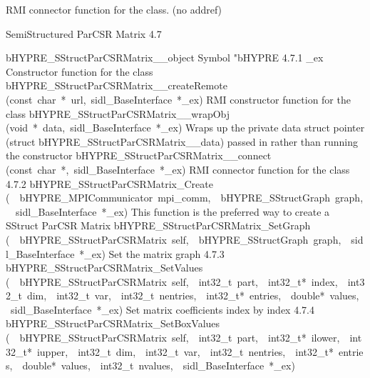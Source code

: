 \documentclass{article}
\begin{document}
\begin{cxxentry}
\begin{cxxentry}
\begin{cxxvariable}
\begin{cxxdoc}
RMI connector function for the class. (no addref)
\end{cxxdoc}
\end{cxxvariable}
\end{cxxentry}
\begin{cxxentry}
{}
        {SemiStructured ParCSR Matrix}
        {}
        {
}
        {4.7}
\begin{cxxnames}
        {bHYPRE\_SStructParCSRMatrix\_\_object}
        {}
        {
Symbol "bHYPRE}
        {4.7.1}
        {\_ex}
        {}
        {
Constructor function for the class}
        {}
\label{cxx.4.7.15}
        {bHYPRE\_SStructParCSRMatrix\_\_createRemote}
        {(const\ char\ *\ url,\ sidl\_BaseInterface\ *\_ex)}
        {
RMI constructor function for the class}
        {}
\label{cxx.4.7.16}
        {bHYPRE\_SStructParCSRMatrix\_\_wrapObj}
        {(void\ *\ data,\ sidl\_BaseInterface\ *\_ex)}
        {
Wraps up the private data struct pointer (struct bHYPRE\_SStructParCSRMatrix\_\_data) passed in rather than running the constructor}
        {}
\label{cxx.4.7.17}
        {bHYPRE\_SStructParCSRMatrix\_\_connect}
        {(const\ char\ *,\ sidl\_BaseInterface\ *\_ex)}
        {
RMI connector function for the class}
        {4.7.2}
        {bHYPRE\_SStructParCSRMatrix\_Create}
        {(\ \ bHYPRE\_MPICommunicator\ mpi\_comm,\ \ bHYPRE\_SStructGraph\ graph,\ \ sidl\_BaseInterface\ *\_ex)}
        {
This function is the preferred way to create a SStruct ParCSR Matrix}
        {}
\label{cxx.4.7.18}
        {bHYPRE\_SStructParCSRMatrix\_SetGraph}
        {(\ \ bHYPRE\_SStructParCSRMatrix\ self,\ \ bHYPRE\_SStructGraph\ graph,\ \ sidl\_BaseInterface\ *\_ex)}
        {
Set the matrix graph}
        {4.7.3}
        {bHYPRE\_SStructParCSRMatrix\_SetValues}
        {(\ \ bHYPRE\_SStructParCSRMatrix\ self,\ \ int32\_t\ part,\ \ int32\_t*\ index,\ \ int32\_t\ dim,\ \ int32\_t\ var,\ \ int32\_t\ nentries,\ \ int32\_t*\ entries,\ \ double*\ values,\ \ sidl\_BaseInterface\ *\_ex)}
        {
Set matrix coefficients index by index}
        {4.7.4}
        {bHYPRE\_SStructParCSRMatrix\_SetBoxValues}
        {(\ \ bHYPRE\_SStructParCSRMatrix\ self,\ \ int32\_t\ part,\ \ int32\_t*\ ilower,\ \ int32\_t*\ iupper,\ \ int32\_t\ dim,\ \ int32\_t\ var,\ \ int32\_t\ nentries,\ \ int32\_t*\ entries,\ \ double*\ values,\ \ int32\_t\ nvalues,\ \ sidl\_BaseInterface\ *\_ex)}

\end{cxxnames}
\end{cxxentry}
\end{cxxentry}
\end{document}
